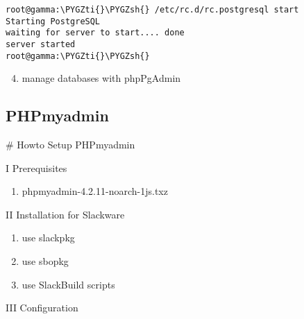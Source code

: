 \documentclass[letterpaper,10pt,english]{sphinxmanual}
\def\PYGZsh{\char`\#}
\def\PYGZti{\char`\~}
\begin{document}
\begin{Verbatim}[commandchars=\\\{\}]
root@gamma:\PYGZti{}\PYGZsh{} /etc/rc.d/rc.postgresql start
Starting PostgreSQL
waiting for server to start.... done
server started
root@gamma:\PYGZti{}\PYGZsh{}
\end{Verbatim}
\begin{enumerate}
\setcounter{enumi}{3}
\item {} 
manage databases with phpPgAdmin

\end{enumerate}


\subsection{PHPmyadmin}
\label{sdocs/databases/phpmyadmin/phpmyadmin:phpmyadmin}\label{sdocs/databases/phpmyadmin/phpmyadmin::doc}
\# Howto Setup PHPmyadmin

I Prerequisites
\begin{enumerate}
\item {} 
phpmyadmin-4.2.11-noarch-1js.txz

\end{enumerate}

II Installation for Slackware
\begin{enumerate}
\item {} 
use slackpkg

\item {} 
use sbopkg

\item {} 
use SlackBuild scripts

\end{enumerate}

III Configuration
\end{document}
